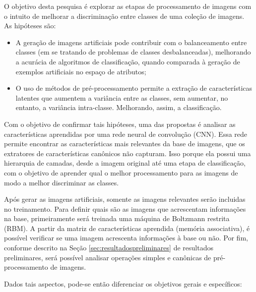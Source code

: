 
O objetivo desta pesquisa é explorar as etapas de processamento de imagens com o intuito de melhorar a discriminação entre classes de uma coleção de imagens. As hipóteses são:


\begin{itemize}
\item A geração de imagens artificiais pode contribuir com o balanceamento entre classes (em se tratando de problemas de classes desbalanceadas), melhorando a acurácia de algoritmos de classificação, quando comparada à geração de exemplos artificiais no espaço de atributos;
\item O uso de métodos de pré-processamento permite a extração de características latentes que aumentem a variância entre as classes, sem aumentar, no entanto, a variância intra-classe. Melhorando, assim, a classificação.
\end{itemize}

Com o objetivo de confirmar tais hipóteses, uma das propostas é analisar as características aprendidas por uma rede neural de convolução (CNN). Essa rede permite encontrar as características mais relevantes da base de imagens, que os extratores de características canônicos não capturam. Isso porque ela possui uma hierarquia de camadas, desde a imagem original até uma etapa de classificação, com o objetivo de aprender qual o melhor processamento para as imagens de modo a melhor discriminar as classes.

Após gerar as imagens artificiais, somente as imagens relevantes serão incluidas no treinamento. Para definir quais são as imagens que acrescentam informações na base, primeiramente será treinada uma máquina de Boltzmann restrita (RBM). A partir da matriz de características aprendida (memória associativa), é possível verificar se uma imagem acrescenta informações à base ou não. Por fim, conforme descrito na Seção \ref{sec:resultadospreliminares} de resultados preliminares, será possível analisar operações simples e canônicas de pré-processamento de imagens.

Dados tais aspectos, pode-se então diferenciar os objetivos gerais e específicos:


